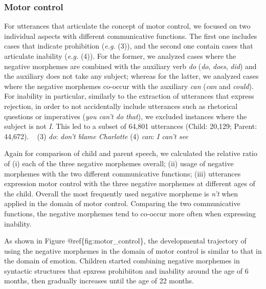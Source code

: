 \documentclass[10pt, letterpaper]{article}
\begin{document}
\hypertarget{motor-control}{%
\subsubsection{Motor control}\label{motor-control}}

For utterances that articulate the concept of motor control, we focused
on two individual aspects with different communicative functions. The
first one includes cases that indicate prohibition (\emph{e.g.} (3)),
and the second one contain cases that articulate inability (\emph{e.g.}
(4)). For the former, we analyzed cases where the negative morphemes are
combined with the auxiliary verb \emph{do} (\emph{do}, \emph{does},
\emph{did}) and the auxiliary does not take any subject; whereas for the
latter, we analyzed cases where the negative morphemes co-occur with the
auxiliary \emph{can} (\emph{can} and \emph{could}). For inability in
particular, similarly to the extraction of utterances that express
rejection, in order to not accidentally include utterances such as
rhetorical questions or imperatives (\emph{you can't do that}), we
excluded instances where the subject is not \emph{I}. This led to a
subset of 64,801 utterances (Child: 20,129; Parent: 44,672). ~ (3)
\emph{do}: \emph{don't blame Charlotte} (4) \emph{can}: \emph{I can't
see} ~

Again for comparison of child and parent speech, we calculated the
relative ratio of (i) each of the three negative morphemes overall; (ii)
usage of negative morphemes with the two different communicative
functions; (iii) utterances expression motor control with the three
negative morphemes at different ages of the child. Overall the most
frequently used negative morpheme is \emph{n't} when applied in the
domain of motor control. Comparing the two communicative functions, the
negative morphemes tend to co-occur more often when expressing
inability.

As shown in Figure @ref\{fig:motor\_control\}, the developmental
trajectory of using the negative morphemes in the domain of motor
control is similar to that in the domain of emotion. Children started
combining negative morphemes in syntactic structures that epxress
prohibiiton and inability around the age of 6 months, then gradually
increases until the age of 22 months.
\end{document}
